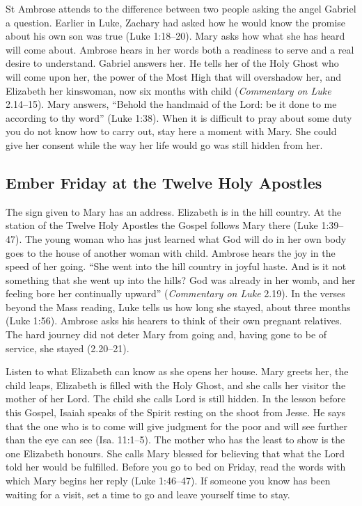 St Ambrose attends to the difference between two people asking the
angel Gabriel a question. Earlier in Luke, Zachary had asked how he
would know the promise about his own son was true (Luke 1:18--20).
Mary asks how what she has heard will come about. Ambrose hears in
her words both a readiness to serve and a real desire to understand.
Gabriel answers her. He tells her of the Holy Ghost who will come
upon her, the power of the Most High that will overshadow her, and
Elizabeth her kinswoman, now six months with child
(\emph{Commentary on Luke} 2.14--15). Mary answers, “Behold the
handmaid of the Lord: be it done to me according to thy word”
(Luke 1:38). When it is difficult to pray
about some duty you do not know how to carry out, stay here a moment
with Mary. She could give her consent while the way her life would go
was still hidden from her.

\subsection{Ember Friday at the Twelve Holy Apostles}

The sign given to Mary has an address. Elizabeth is in the hill country.
At the station of the Twelve Holy Apostles the Gospel follows Mary there
(Luke 1:39--47). The young woman who has just learned what God will
do in her own body goes to the house of another woman with child.
Ambrose hears the joy in the speed of her going. “She went into the
hill country in joyful haste. And is it not something that she went up
into the hills? God was already in her womb, and her feeling bore her
continually upward” (\emph{Commentary on Luke} 2.19). In the verses
beyond the Mass reading, Luke tells us how long she stayed, about three
months (Luke 1:56). Ambrose asks his hearers to think of their own
pregnant relatives. The hard journey did not deter Mary from going
and, having gone to be of service, she stayed (2.20--21).

Listen to what Elizabeth can know as she opens her house. Mary greets
her, the child leaps, Elizabeth is filled with the Holy Ghost, and she
calls her visitor the mother of her Lord. The child she calls Lord is
still hidden. In the lesson before this Gospel, Isaiah speaks of the
Spirit resting on the shoot from Jesse. He says that the one who is to
come will give judgment for the poor and will see further than the eye
can see (Isa. 11:1--5). The mother who has the least to show is the one
Elizabeth honours. She calls Mary blessed for believing that what the
Lord told her would be fulfilled. Before you go to bed on Friday,
read the words with which Mary begins her reply (Luke 1:46--47).
If someone you know has been waiting for a visit, set a time to go and
leave yourself time to stay.

